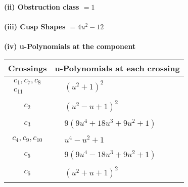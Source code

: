 \documentclass[1p]{elsarticle_modified}
\theoremstyle{definition}
\begin{document}
\flushleft \textbf{(ii) Obstruction class $= 1$}\\~\\
\flushleft \textbf{(iii) Cusp Shapes $= 4 u^2-12$}\\~\\
\newpage\renewcommand{\arraystretch}{1}
\flushleft \textbf{(iv) u-Polynomials at the component}\newline \\
\begin{tabular}{m{50pt}|m{274pt}}
Crossings & \hspace{64pt}u-Polynomials at each crossing \\
\hline $$\begin{aligned}c_{1},c_{7},c_{8}\\c_{11}\end{aligned}$$&$\begin{aligned}
&(u^2+1)^2
\end{aligned}$\\
\hline $$\begin{aligned}c_{2}\end{aligned}$$&$\begin{aligned}
&(u^2- u+1)^2
\end{aligned}$\\
\hline $$\begin{aligned}c_{3}\end{aligned}$$&$\begin{aligned}
&9(9 u^4+18 u^3+9 u^2+1)
\end{aligned}$\\
\hline $$\begin{aligned}c_{4},c_{9},c_{10}\end{aligned}$$&$\begin{aligned}
&u^4- u^2+1
\end{aligned}$\\
\hline $$\begin{aligned}c_{5}\end{aligned}$$&$\begin{aligned}
&9(9 u^4-18 u^3+9 u^2+1)
\end{aligned}$\\
\hline $$\begin{aligned}c_{6}\end{aligned}$$&$\begin{aligned}
&(u^2+u+1)^2
\end{aligned}$\\
\hline
\end{tabular}\\~\\
\end{document}
